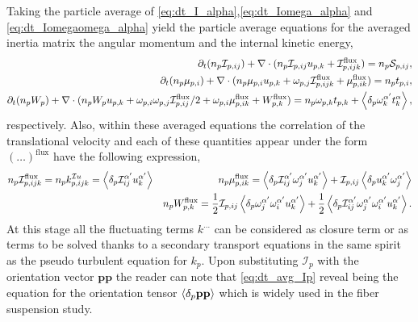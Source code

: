 Taking the particle average of \ref{eq:dt_I_alpha},\ref{eq:dt_Iomega_alpha} and \ref{eq:dt_Iomegaomega_alpha} yield the particle average equations for the averaged inertia matrix the angular momentum and the internal kinetic energy, 
\begin{align}
    \label{eq:dt_avg_Ip}
    \pddt (n_p\mathcal{I}_{p,ij})
    + \div (n_p\mathcal{I}_{p,ij} u_{p,k}
    + \mathcal{I}^\text{flux}_{p,ijk})
    = n_p \mathcal{S}_{p,ij},\\ 
    \label{eq:dt_avg_mup}
    \pddt (
    n_p \mu_{p,i}
    )
    + \div (
        n_p \mu_{p,i}u_{p,k}
    +  \omega_{p,j} \mathcal{I}^\text{flux}_{p,ijk}
    + \mu_{p,ik}^\text{flux}
    )
    = n_p t_{p,i},\\
    \pddt (n_p W_p)
    + \div  (
        n_p W_p u_{p,k}
        + \omega_{p,i} \omega_{p,j}
        \mathcal{I}_{p,ij}^\text{flux}/2
        + \omega_{p,i}\mu_{p,ik}^\text{flux}
    + W_{p,k}^\text{flux}
    )
    = 
    n_p \omega_{p,k} t_{p,k}
    +  \pavg{\omega_k^{\alpha'} t^\alpha_k},
\end{align}
respectively. 
Also, within these averaged equations the correlation of the translational velocity and each of these quantities  appear under the form $(\ldots)^\text{flux}$ have the following expression, 
\begin{align*}
    n_p \mathcal{I}_{p,ijk}^\text{flux}
    = n_p k_{p,ijk}^{\mathcal{I}u}
    = 
    \left<\delta_{p} \mathcal{I}^{\alpha'}_{ij} u_{k}^{\alpha'}\right>
    &&
    n_p \mu_{p,ik}^\text{flux}
    = 
    \left<\delta_{p} \mathcal{I}^{\alpha'}_{ij} \omega^{\alpha'}_j u_{k}^{\alpha'}\right> 
    + \mathcal{I}_{p,ij} \left<\delta_{p} u_k^{\alpha'}\omega_j^{\alpha'}\right>\\
    && n_p W_{p,k}^\text{flux}
    = \frac{1}{2}\mathcal{I}_{p,ij}
    \left<\delta_{p} 
        \omega_j^{\alpha'}
        \omega_i^{\alpha'}
        u_k^{\alpha'}
    \right>
    + \frac{1}{2}\left<\delta_{p} 
        \mathcal{I}_{ij}^{\alpha'}
        \omega_j^{\alpha'}
        \omega_i^{\alpha'}
        u_k^{\alpha'}
    \right>.
\end{align*}
At this stage all the fluctuating terms $k^{\ldots}$ can be considered as closure term or as terms to be solved thanks to a secondary transport equations in the same spirit as the pseudo turbulent equation for $k_p$.
Upon substituting $\mathcal{I}_p$ with the orientation vector $\textbf{pp}$ the reader can note that \ref{eq:dt_avg_Ip} reveal being the equation for the orientation tensor $\left<\delta_{p} \textbf{pp}\right>$ \citep{wang2008objective} which is widely used in the fiber suspension study. 
